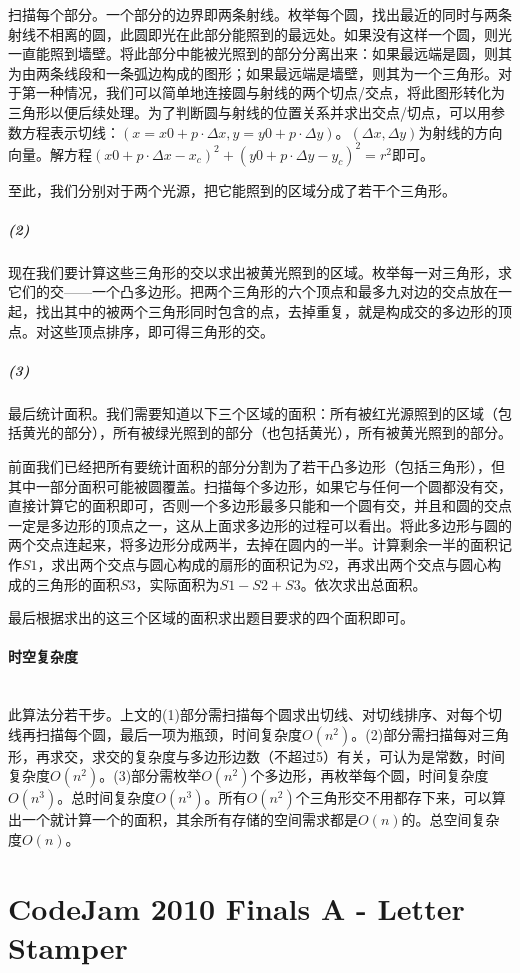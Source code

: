 \documentclass[UTF8]{ctexart}
\newcommand{\myparagraph}[1]{\paragraph{#1}\mbox{}\\}
\theoremstyle{nonumberplain}
\begin{document}
			扫描每个部分。一个部分的边界即两条射线。枚举每个圆，找出最近的同时与两条射线不相离的圆，此圆即光在此部分能照到的最远处。如果没有这样一个圆，则光一直能照到墙壁。将此部分中能被光照到的部分分离出来：如果最远端是圆，则其为由两条线段和一条弧边构成的图形；如果最远端是墙壁，则其为一个三角形。对于第一种情况，我们可以简单地连接圆与射线的两个切点/交点，将此图形转化为三角形以便后续处理。为了判断圆与射线的位置关系并求出交点/切点，可以用参数方程表示切线：$(x=x0+p \cdot \Delta x, y=y0+p \cdot \Delta y)$。$(\Delta x, \Delta y)$为射线的方向向量。解方程$(x0+p \cdot \Delta x-x_c)^2+(y0+p \cdot \Delta y-y_c)^2=r^2$即可。
			
			至此，我们分别对于两个光源，把它能照到的区域分成了若干个三角形。
			
			\subparagraph{(2)}
			现在我们要计算这些三角形的交以求出被黄光照到的区域。枚举每一对三角形，求它们的交——一个凸多边形。把两个三角形的六个顶点和最多九对边的交点放在一起，找出其中的被两个三角形同时包含的点，去掉重复，就是构成交的多边形的顶点。对这些顶点排序，即可得三角形的交。
			
			\subparagraph{(3)}
			最后统计面积。我们需要知道以下三个区域的面积：所有被红光源照到的区域（包括黄光的部分），所有被绿光照到的部分（也包括黄光），所有被黄光照到的部分。
			
			前面我们已经把所有要统计面积的部分分割为了若干凸多边形（包括三角形），但其中一部分面积可能被圆覆盖。扫描每个多边形，如果它与任何一个圆都没有交，直接计算它的面积即可，否则一个多边形最多只能和一个圆有交，并且和圆的交点一定是多边形的顶点之一，这从上面求多边形的过程可以看出。将此多边形与圆的两个交点连起来，将多边形分成两半，去掉在圆内的一半。计算剩余一半的面积记作$S1$，求出两个交点与圆心构成的扇形的面积记为$S2$，再求出两个交点与圆心构成的三角形的面积$S3$，实际面积为$S1-S2+S3$。依次求出总面积。
			
			最后根据求出的这三个区域的面积求出题目要求的四个面积即可。
		
		\myparagraph{时空复杂度}
		
			此算法分若干步。上文的(1)部分需扫描每个圆求出切线、对切线排序、对每个切线再扫描每个圆，最后一项为瓶颈，时间复杂度$O(n^2)$。(2)部分需扫描每对三角形，再求交，求交的复杂度与多边形边数（不超过5）有关，可认为是常数，时间复杂度$O(n^2)$。(3)部分需枚举$O(n^2)$个多边形，再枚举每个圆，时间复杂度$O(n^3)$。总时间复杂度$O(n^3)$。所有$O(n^2)$个三角形交不用都存下来，可以算出一个就计算一个的面积，其余所有存储的空间需求都是$O(n)$的。总空间复杂度$O(n)$。
	
	\section{CodeJam 2010 Finals A - Letter Stamper}
	
\end{document}
